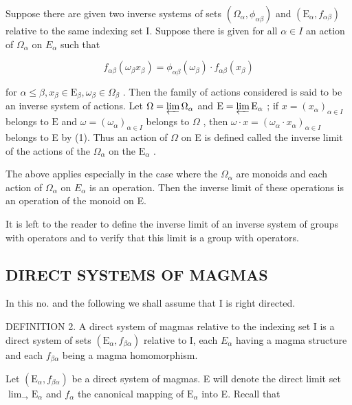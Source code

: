 Suppose there are given two inverse systems of sets \((\Omega_{\alpha}, \phi_{\alpha\beta})\) and \((\mathrm{E}_{\alpha}, f_{\alpha\beta})\) relative to the same indexing set I. Suppose there is given for all \(\alpha \in I\) an action of \(\Omega_{\alpha}\) on \(E_{\alpha}\) such that

\[
f _ {\alpha \beta} (\omega_ {\beta} x _ {\beta}) = \phi_ {\alpha \beta} (\omega_ {\beta}) \cdot f _ {\alpha \beta} (x _ {\beta})\tag{1}
\]

for \(\alpha \leqslant \beta, x_{\beta} \in \mathrm{E}_{\beta}, \omega_{\beta} \in \Omega_{\beta}\) . Then the family of actions considered is said to be an inverse system of actions. Let \(\Omega = \varprojlim \Omega_{\alpha}\) and \(\mathrm{E} = \varprojlim \mathrm{E}_{\alpha}\) ; if \(x = (x_{\alpha})_{\alpha \in I}\) belongs to \(\mathrm{E}\) and \(\omega = (\omega_{\alpha})_{\alpha \in I}\) belongs to \(\Omega\) , then \(\omega \cdot x = (\omega_{\alpha} \cdot x_{\alpha})_{\alpha \in I}\) belongs to E by (1). Thus an action of \(\Omega\) on E is defined called the inverse limit of the actions of the \(\Omega_{\alpha}\) on the \(\mathrm{E}_{\alpha}\) .

The above applies especially in the case where the \(\Omega_{\alpha}\) are monoids and each action of \(\Omega_{\alpha}\) on \(E_{\alpha}\) is an operation. Then the inverse limit of these operations is an operation of the monoid on E.

It is left to the reader to define the inverse limit of an inverse system of groups with operators and to verify that this limit is a group with operators.

\subsection{DIRECT SYSTEMS OF MAGMAS}

In this no. and the following we shall assume that I is right directed.

DEFINITION 2. A direct system of magmas relative to the indexing set I is a direct system of sets \((\mathrm{E}_{\alpha}, f_{\beta\alpha})\) relative to I, each \(E_{\alpha}\) having a magma structure and each \(f_{\beta\alpha}\) being a magma homomorphism.

Let \((\mathrm{E}_{\alpha}, f_{\beta\alpha})\) be a direct system of magmas. E will denote the direct limit set \(\lim_{\rightarrow} \mathrm{E}_{\alpha}\) and \(f_{\alpha}\) the canonical mapping of \(\mathrm{E}_{\alpha}\) into E. Recall that

